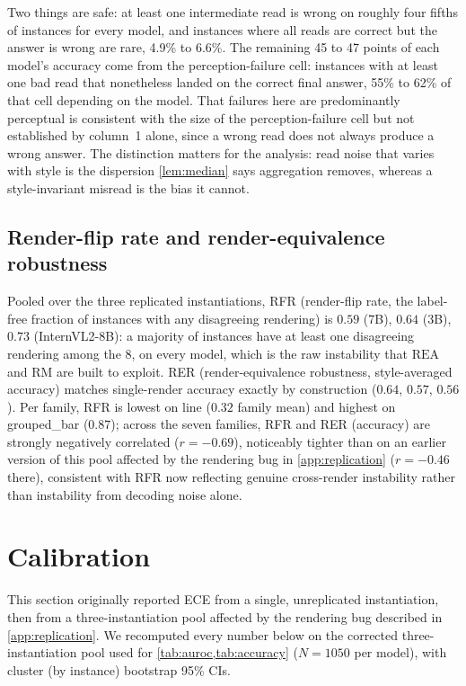 \documentclass[11pt]{article}
\newcommand{\rea}{\mathrm{REA}}
\newcommand{\rmg}{\mathrm{RM}}
\begin{document}
Two things are safe: at least one intermediate read is wrong on roughly four fifths of instances for every model, and instances where all reads are correct but the answer is wrong are rare, 4.9\% to 6.6\%. The remaining 45 to 47 points of each model's accuracy come from the perception-failure cell: instances with at least one bad read that nonetheless landed on the correct final answer, 55\% to 62\% of that cell depending on the model. That failures here are predominantly perceptual is consistent with the size of the perception-failure cell but not established by column~1 alone, since a wrong read does not always produce a wrong answer. The distinction matters for the analysis: read noise that varies with style is the dispersion \cref{lem:median} says aggregation removes, whereas a style-invariant misread is the bias it cannot.

\subsection{Render-flip rate and render-equivalence robustness}
\label{app:rfr}

Pooled over the three replicated instantiations, RFR (render-flip rate, the label-free fraction of instances with any disagreeing rendering) is $0.59$ (7B), $0.64$ (3B), $0.73$ (InternVL2-8B): a majority of instances have at least one disagreeing rendering among the 8, on every model, which is the raw instability that $\rea$ and $\rmg$ are built to exploit. RER (render-equivalence robustness, style-averaged accuracy) matches single-render accuracy exactly by construction ($0.64$, $0.57$, $0.56$). Per family, RFR is lowest on line ($0.32$ family mean) and highest on grouped\_bar ($0.87$); across the seven families, RFR and RER (accuracy) are strongly negatively correlated ($r{=}{-0.69}$), noticeably tighter than on an earlier version of this pool affected by the rendering bug in \cref{app:replication} ($r{=}{-0.46}$ there), consistent with RFR now reflecting genuine cross-render instability rather than instability from decoding noise alone.

\section{Calibration}
\label{app:calibration}

This section originally reported ECE from a single, unreplicated instantiation, then from a three-instantiation pool affected by the rendering bug described in \cref{app:replication}. We recomputed every number below on the corrected three-instantiation pool used for \cref{tab:auroc,tab:accuracy} ($N{=}1050$ per model), with cluster (by instance) bootstrap 95\% CIs.
\end{document}
